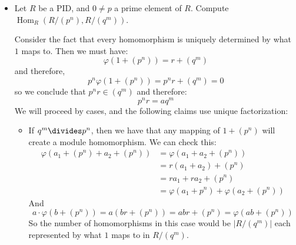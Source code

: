 \documentclass{article}
\begin{document}
\begin{itemize}
        \item Let $R$ be a PID, and $0 \neq p$ a prime element of $R$. Compute $\mathop{Hom}_{R}(R/(p^{n}), R/(q^{m}))$.
            \begin{answer}
                Consider the fact that every homomorphism is uniquely determined by what $1$ maps to. Then we must have:
                    \begin{equation*}
                        \varphi(1 + (p^{n})) = r + (q^{m})
                    \end{equation*}
                and therefore,
                    \begin{equation*}
                        p^{n}\varphi(1 + (p^{n})) = p^{n}r + (q^{m}) = 0
                    \end{equation*}
                so we conclude that $p^{n}r \in (q^{m})$ and therefore:
                    \begin{equation*}
                        p^{n}r = aq^{m}
                    \end{equation*}
                We will proceed by cases, and the following claims use unique factorization:
                    \begin{itemize}
                        \item If $q^{m} \divides p^{n}$, then we have that any mapping of $1 + (p^{n})$ will create a module homomorphism. We can check this:
                            \begin{align*}
                                \varphi(a_{1} + (p^{n}) + a_{2} + (p^{n})) &= \varphi(a_{1} + a_{2} + (p^{n}))                  \\
                                                                           &= r(a_{1} + a_{2}) + (p^{n})                        \\
                                                                           &= ra_{1} + ra_{2} + (p^{n})                         \\
                                                                           &= \varphi(a_{1} + p^{n}) + \varphi(a_{2} + (p^{n}))   
                            \end{align*}
                        And 
                            \begin{equation*}
                                a \cdot \varphi(b + (p^{n})) = a(br + (p^{n})) = abr + (p^{n}) = \varphi(ab + (p^{n}))
                            \end{equation*}
                        So the number of homomorphisms in this case would be $\lvert R/(q^{m}) \rvert$ each represented by what $1$ maps to in $R/(q^{m})$.


\end{itemize}
\end{answer}
\end{itemize}
\end{document}
